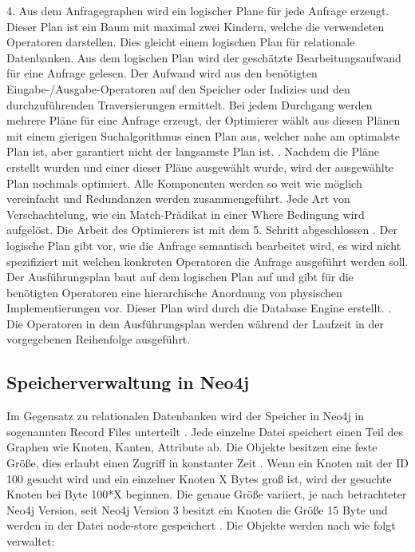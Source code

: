 4. Aus dem Anfragegraphen wird ein logischer Plane für jede Anfrage erzeugt. Dieser Plan ist ein Baum mit maximal zwei Kindern, welche die verwendeten Operatoren darstellen. Dies gleicht einem logischen Plan für relationale Datenbanken. Aus dem logischen Plan wird der geschätzte Bearbeitungsaufwand für eine Anfrage gelesen. Der Aufwand wird aus den benötigten Eingabe-/Ausgabe-Operatoren auf den Speicher oder Indizies und den durchzuführenden Traversierungen ermittelt. Bei jedem Durchgang werden mehrere Pläne für eine Anfrage erzeugt, der Optimierer wählt aus diesen Plänen mit einem gierigen Suchalgorithmus einen Plan aus, welcher nahe am optimalste Plan ist, aber garantiert nicht der langsamste Plan ist. \newline {}. Nachdem die Pläne erstellt wurden und einer dieser Pläne ausgewählt wurde, wird der ausgewählte Plan nochmals optimiert. Alle Komponenten werden so weit wie möglich vereinfacht und Redundanzen werden zusammengeführt. Jede Art von Verschachtelung, wie ein Match-Prädikat in einer Where Bedingung wird aufgelöst. Die Arbeit des Optimierers ist mit dem 5. Schritt abgeschlossen \newline {}. Der logische Plan gibt vor, wie die Anfrage semantisch bearbeitet wird, es wird nicht spezifiziert mit welchen konkreten Operatoren die Anfrage ausgeführt werden soll. Der Ausführungsplan baut auf dem logischen Plan auf und gibt für die benötigten Operatoren eine hierarchische Anordnung von physischen  Implementierungen vor. Dieser Plan wird durch die Database Engine erstellt.  \newline {}. Die Operatoren in dem Ausführungsplan werden während der Laufzeit in der vorgegebenen Reihenfolge ausgeführt. 


\subsection{Speicherverwaltung in Neo4j}
Im Gegensatz zu relationalen Datenbanken wird der Speicher in Neo4j in sogenannten Record Files unterteilt \parencite{angles2012comparison}. Jede einzelne Datei speichert einen Teil des Graphen wie Knoten, Kanten, Attribute ab. Die Objekte besitzen eine feste Größe, dies erlaubt einen Zugriff in konstanter Zeit \parencite{robinson2013graph}. Wenn ein Knoten mit der ID 100 gesucht wird und ein einzelner Knoten X Bytes groß ist, wird der gesuchte Knoten bei Byte 100*X beginnen. Die genaue Größe  variiert, je nach betrachteter Neo4j Version, seit Neo4j Version 3 besitzt ein Knoten die Größe 15 Byte und werden in der Datei node-store gespeichert \parencite{Storage}. Die Objekte werden nach \parencite{robinson2013graph} wie folgt verwaltet:
